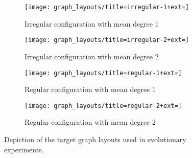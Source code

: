\begin{figure}
\begin{center}

\begin{subfigure}[b]{0.45\columnwidth}
\centering
\texttt{[image: graph\_layouts/title=irregular-1+ext=]}%
\caption{
Irregular configuration with mean degree 1
}
\label{fig:irregular_1}
\end{subfigure}
\begin{subfigure}[b]{0.45\columnwidth}
\centering
\texttt{[image: graph\_layouts/title=irregular-2+ext=]}%
\caption{
Irregular configuration with mean degree 2
}
\label{fig:irregular_2}
\end{subfigure}

\begin{subfigure}[b]{0.45\columnwidth}
\centering
\texttt{[image: graph\_layouts/title=regular-1+ext=]}%
\caption{
Regular configuration with mean degree 1
}
\label{fig:regular_1}
\end{subfigure}
\begin{subfigure}[b]{0.44\columnwidth}
\centering
\texttt{[image: graph\_layouts/title=regular-2+ext=]}%
\caption{
Regular configuration with mean degree 2
}
\label{fig:regular_2}
\end{subfigure}

\caption{
Depiction of the target graph layouts used in evolutionary experiments.
}
\label{fig:graph_layouts}

\end{center}
\end{figure}
